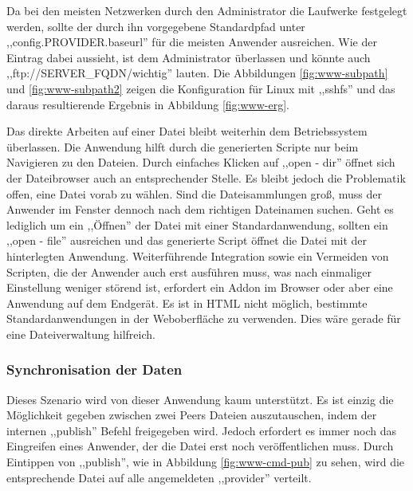 \documentclass[oneside, ngerman, toc=bibliography,bibliography=totoc,listof=entryprefix, open=right,numbers=noenddot,fontsize=12pt]{scrbook}
\begin{document}
Da bei den meisten Netzwerken durch den Administrator die Laufwerke festgelegt werden, sollte der durch ihn vorgegebene Standardpfad unter ,,config.{PROVIDER}.baseurl'' für die meisten Anwender ausreichen. Wie der Eintrag dabei aussieht, ist dem Administrator überlassen und könnte auch ,,ftp://SERVER\_FQDN/wichtig'' lauten.
Die Abbildungen \ref{fig:www-subpath} und \ref{fig:www-subpath2} zeigen die Konfiguration für Linux mit ,,sshfs'' und das daraus resultierende Ergebnis in Abbildung \ref{fig:www-erg}.

Das direkte Arbeiten auf einer Datei bleibt weiterhin dem Betriebssystem überlassen. Die Anwendung hilft durch die generierten Scripte nur beim Navigieren zu den Dateien. Durch einfaches Klicken auf ,,open - dir'' öffnet sich der Dateibrowser auch an entsprechender Stelle. Es bleibt jedoch die Problematik offen, eine Datei vorab zu wählen. Sind die Dateisammlungen groß, muss der Anwender im Fenster dennoch nach dem richtigen Dateinamen suchen. Geht es lediglich um ein ,,Öffnen'' der Datei mit einer Standardanwendung, sollten ein ,,open - file'' ausreichen und das generierte Script öffnet die Datei mit der hinterlegten Anwendung.
Weiterführende Integration sowie ein Vermeiden von Scripten, die der Anwender auch erst ausführen muss, was nach einmaliger Einstellung weniger störend ist, erfordert ein Addon im Browser oder aber eine Anwendung auf dem Endgerät. Es ist in HTML nicht möglich, bestimmte Standardanwendungen in der Weboberfläche zu verwenden. Dies wäre gerade für eine Dateiverwaltung hilfreich.

 
\subsubsection{Synchronisation der Daten}
Dieses Szenario wird von dieser Anwendung kaum unterstützt. Es ist einzig die Möglichkeit gegeben zwischen zwei Peers Dateien auszutauschen, indem der internen ,,publish'' Befehl freigegeben wird. Jedoch erfordert es immer noch das Eingreifen eines Anwender, der die Datei erst noch veröffentlichen muss. Durch Eintippen von ,,publish'', wie in Abbildung \ref{fig:www-cmd-pub} zu sehen, wird die entsprechende Datei auf alle angemeldeten ,,provider'' verteilt.
\end{document}
